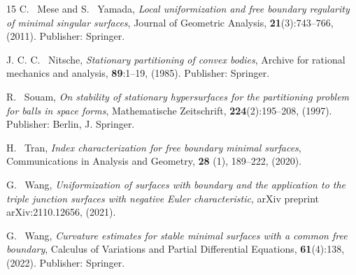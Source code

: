 \documentclass[11pt]{amsart}
\numberwithin{equation}{section}
\theoremstyle{theorem}
\theoremstyle{definition}
\numberwithin{equation}{section}
\begin{document}
\begin{thebibliography}{15}
C. ~Mese and S. ~Yamada, 
\emph{Local uniformization and free boundary regularity of minimal singular surfaces},
Journal of Geometric Analysis, \textbf{21}(3):743--766, (2011).
Publisher: Springer.

J. C. C. ~Nitsche, 
\emph{Stationary partitioning of convex bodies},
Archive for rational mechanics and analysis, \textbf{89}:1--19, (1985).
Publisher: Springer.

R. ~Souam, 
\emph{On stability of stationary hypersurfaces for the partitioning problem for balls in space forms},
Mathematische Zeitschrift, \textbf{224}(2):195--208, (1997).
Publisher: Berlin, J. Springer.


H. ~Tran, 
\emph{Index characterization for free boundary minimal surfaces}, 
Communications in Analysis and Geometry, \textbf{28} (1), 189--222, (2020).


G. ~Wang, 
\emph{Uniformization of surfaces with boundary and the application to the triple junction surfaces with negative Euler characteristic},
arXiv preprint arXiv:2110.12656, (2021).

G. ~Wang, 
\emph{Curvature estimates for stable minimal surfaces with a common free boundary},
Calculus of Variations and Partial Differential Equations, \textbf{61}(4):138, (2022).
Publisher: Springer.

\end{thebibliography}
\end{document}
